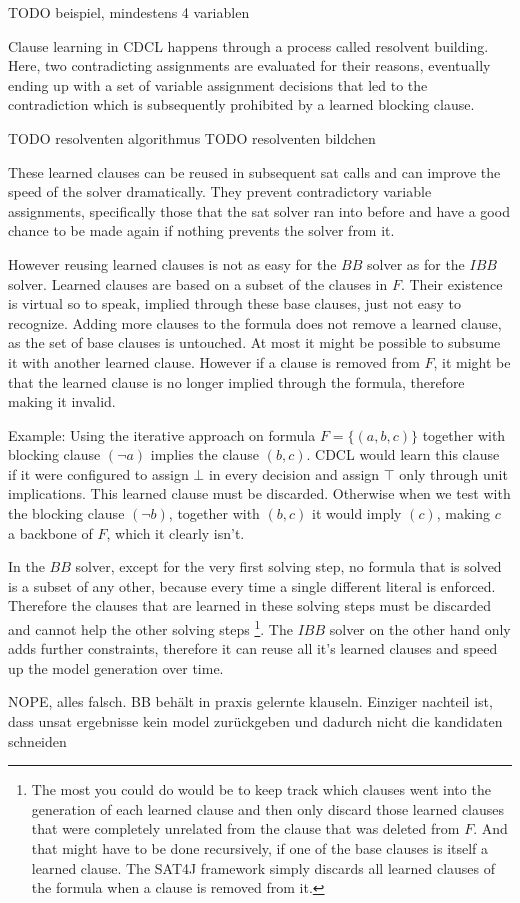 TODO beispiel, mindestens 4 variablen 

Clause learning in CDCL happens through a process called resolvent building. Here, two contradicting assignments are evaluated for their reasons, eventually ending up with a set of variable assignment decisions that led to the contradiction which is subsequently prohibited by a learned blocking clause.

TODO resolventen algorithmus \newline
TODO resolventen bildchen 

These learned clauses can be reused in subsequent sat calls and can improve the speed of the solver dramatically. They prevent contradictory variable assignments, specifically those that the sat solver ran into before and have a good chance to be made again if nothing prevents the solver from it. 

However reusing learned clauses is not as easy for the $BB$ solver as for the $IBB$ solver. Learned clauses are based on a subset of the clauses in $F$. Their existence is virtual so to speak, implied through these base clauses, just not easy to recognize. Adding more clauses to the formula does not remove a learned clause, as the set of base clauses is untouched. At most it might be possible to subsume it with another learned clause. However if a clause is removed from $F$, it might be that the learned clause is no longer implied through the formula, therefore making it invalid. 


Example: Using the iterative approach on formula $F = \{(a,b,c)\}$ together with blocking clause $(\neg a)$ implies the clause $(b,c)$. CDCL would learn this clause if it were configured to assign $\bot$ in every decision and assign $\top$ only through unit implications. This learned clause must be discarded. Otherwise when we test with the blocking clause $(\neg b)$, together with $(b,c)$ it would imply $(c)$, making $c$ a backbone of $F$, which it clearly isn't.


In the $BB$ solver, except for the very first solving step, no formula that is solved is a subset of any other, because every time a single different literal is enforced. Therefore the clauses that are learned in these solving steps must be discarded and cannot help the other solving steps \footnote{
The most you could do would be to keep track which clauses went into the generation of each learned clause and then only discard those learned clauses that were completely unrelated from the clause that was deleted from $F$. And that might have to be done recursively, if one of the base clauses is itself a learned clause. The SAT4J framework simply discards all learned clauses of the formula when a clause is removed from it.}. 
The $IBB$ solver on the other hand only adds further constraints, therefore it can reuse all it's learned clauses and speed up the model generation over time.

NOPE, alles falsch. BB behält in praxis gelernte klauseln. Einziger nachteil ist, dass unsat ergebnisse kein model zurückgeben und dadurch nicht die kandidaten schneiden